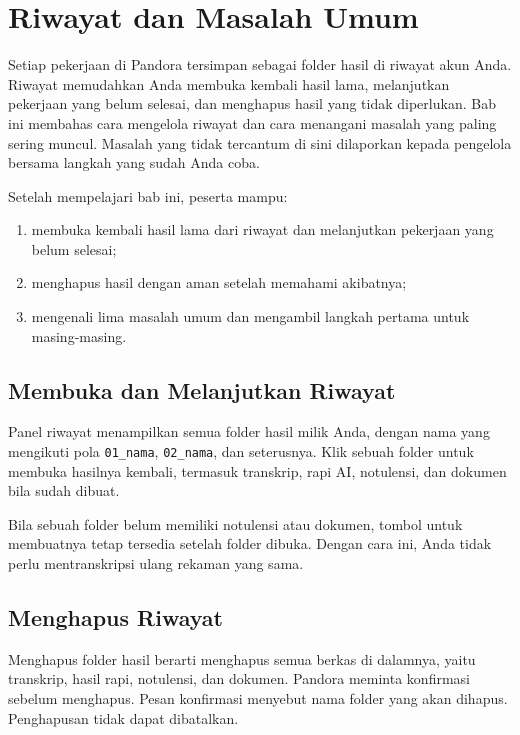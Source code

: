 \chapter{Riwayat dan Masalah Umum}

Setiap pekerjaan di Pandora tersimpan sebagai folder hasil di riwayat akun Anda. Riwayat memudahkan Anda membuka kembali hasil lama, melanjutkan pekerjaan yang belum selesai, dan menghapus hasil yang tidak diperlukan. Bab ini membahas cara mengelola riwayat dan cara menangani masalah yang paling sering muncul. Masalah yang tidak tercantum di sini dilaporkan kepada pengelola bersama langkah yang sudah Anda coba.

\begin{indikator}
Setelah mempelajari bab ini, peserta mampu:
\begin{enumerate}
  \item membuka kembali hasil lama dari riwayat dan melanjutkan pekerjaan yang belum selesai;
  \item menghapus hasil dengan aman setelah memahami akibatnya;
  \item mengenali lima masalah umum dan mengambil langkah pertama untuk masing-masing.
\end{enumerate}
\end{indikator}

\section{Membuka dan Melanjutkan Riwayat}
Panel riwayat menampilkan semua folder hasil milik Anda, dengan nama yang mengikuti pola \texttt{01\_nama}, \texttt{02\_nama}, dan seterusnya. Klik sebuah folder untuk membuka hasilnya kembali, termasuk transkrip, rapi AI, notulensi, dan dokumen bila sudah dibuat.

Bila sebuah folder belum memiliki notulensi atau dokumen, tombol untuk membuatnya tetap tersedia setelah folder dibuka. Dengan cara ini, Anda tidak perlu mentranskripsi ulang rekaman yang sama.

\section{Menghapus Riwayat}
Menghapus folder hasil berarti menghapus semua berkas di dalamnya, yaitu transkrip, hasil rapi, notulensi, dan dokumen. Pandora meminta konfirmasi sebelum menghapus. Pesan konfirmasi menyebut nama folder yang akan dihapus. Penghapusan tidak dapat dibatalkan.

